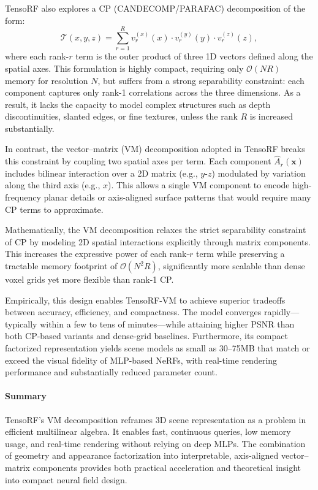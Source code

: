 \begin{enrichment}
\begin{enrichment}
    TensoRF also explores a CP (CANDECOMP/PARAFAC) decomposition of the form:
    \[
    \mathcal{T}(x, y, z) = \sum_{r=1}^R v^{(x)}_r(x) \cdot v^{(y)}_r(y) \cdot v^{(z)}_r(z),
    \]
    where each rank-\( r \) term is the outer product of three 1D vectors defined along the spatial axes. This formulation is highly compact, requiring only \( \mathcal{O}(N R) \) memory for resolution \( N \), but suffers from a strong separability constraint: each component captures only rank-1 correlations across the three dimensions. As a result, it lacks the capacity to model complex structures such as depth discontinuities, slanted edges, or fine textures, unless the rank \( R \) is increased substantially.
    
    In contrast, the vector--matrix (VM) decomposition adopted in TensoRF breaks this constraint by coupling two spatial axes per term. Each component \( \hat{A}_r(\mathbf{x}) \) includes bilinear interaction over a 2D matrix (e.g., \( y \)-\( z \)) modulated by variation along the third axis (e.g., \( x \)). This allows a single VM component to encode high-frequency planar details or axis-aligned surface patterns that would require many CP terms to approximate.
    
    Mathematically, the VM decomposition relaxes the strict separability constraint of CP by modeling 2D spatial interactions explicitly through matrix components. This increases the expressive power of each rank-\( r \) term while preserving a tractable memory footprint of \( \mathcal{O}(N^2 R) \), significantly more scalable than dense voxel grids yet more flexible than rank-1 CP.
    
    Empirically, this design enables TensoRF-VM to achieve superior tradeoffs between accuracy, efficiency, and compactness. The model converges rapidly—typically within a few to tens of minutes—while attaining higher PSNR than both CP-based variants and dense-grid baselines. Furthermore, its compact factorized representation yields scene models as small as 30–75MB that match or exceed the visual fidelity of MLP-based NeRFs, with real-time rendering performance and substantially reduced parameter count.
    
    \paragraph{Summary}
    
    TensoRF's VM decomposition reframes 3D scene representation as a problem in efficient multilinear algebra. It enables fast, continuous queries, low memory usage, and real-time rendering without relying on deep MLPs. The combination of geometry and appearance factorization into interpretable, axis-aligned vector–matrix components provides both practical acceleration and theoretical insight into compact neural field design.
    

\end{enrichment}
\end{enrichment}
